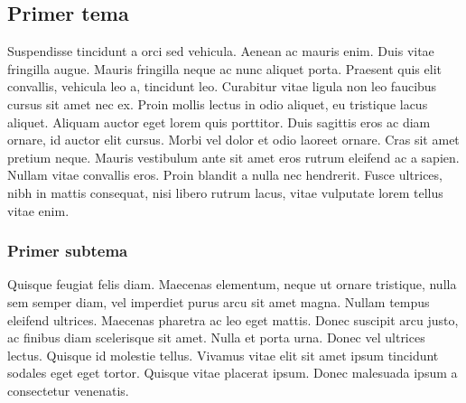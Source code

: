 \subsection*{Primer tema}

Suspendisse tincidunt a orci sed vehicula. Aenean ac mauris enim. Duis vitae fringilla augue. Mauris fringilla neque ac nunc aliquet porta. Praesent quis elit convallis, vehicula leo a, tincidunt leo. Curabitur vitae ligula non leo faucibus cursus sit amet nec ex. Proin mollis lectus in odio aliquet, eu tristique lacus aliquet. Aliquam auctor eget lorem quis porttitor. Duis sagittis eros ac diam ornare, id auctor elit cursus. Morbi vel dolor et odio laoreet ornare. Cras sit amet pretium neque. Mauris vestibulum ante sit amet eros rutrum eleifend ac a sapien. Nullam vitae convallis eros. Proin blandit a nulla nec hendrerit. Fusce ultrices, nibh in mattis consequat, nisi libero rutrum lacus, vitae vulputate lorem tellus vitae enim.

\subsubsection*{Primer subtema}

Quisque feugiat felis diam. Maecenas elementum, neque ut ornare tristique, nulla sem semper diam, vel imperdiet purus arcu sit amet magna. Nullam tempus eleifend ultrices. Maecenas pharetra ac leo eget mattis. Donec suscipit arcu justo, ac finibus diam scelerisque sit amet. Nulla et porta urna. Donec vel ultrices lectus. Quisque id molestie tellus. Vivamus vitae elit sit amet ipsum tincidunt sodales eget eget tortor. Quisque vitae placerat ipsum. Donec malesuada ipsum a consectetur venenatis.
